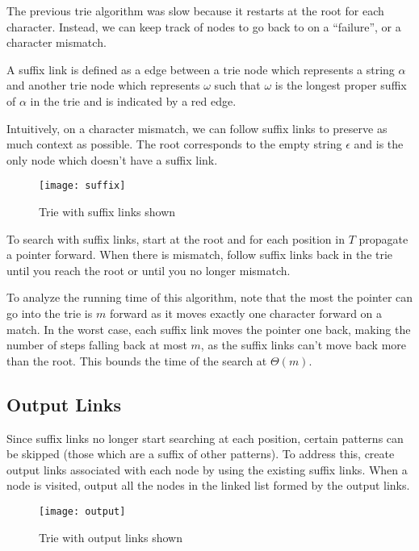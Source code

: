 \documentclass[11pt, oneside]{article}
\begin{document}
The previous trie algorithm was slow because it restarts at the root for each character.
Instead, we can keep track of nodes to go back to on a ``failure'', or a character mismatch.

A suffix link is defined as a edge between a trie node which represents a string \( \alpha \)
and another trie node which represents \( \omega \) such that \( \omega \)
is the longest proper suffix of \( \alpha \) in the trie and is indicated by a red edge.

Intuitively, on a character mismatch, we can follow suffix links to preserve as much context as possible.
The root corresponds to the empty string \( \epsilon \) and is the only node which doesn't have a suffix link.

\begin{figure}[h!]
\centering
\texttt{[image: suffix]}
\caption{Trie with suffix links shown}
\end{figure}

To search with suffix links, start at the root and for each position in \( T \) propagate a pointer
forward. When there is mismatch, follow suffix links back in the trie until you reach the root
or until you no longer mismatch.

To analyze the running time of this algorithm, note that the most the pointer can go
into the trie is \( m \) forward as it moves exactly one character forward on a match.
In the worst case, each suffix link moves the pointer one back, making the
number of steps falling back at most \( m \), as the suffix links can't move back more than the root.
This bounds the time of the search at \( \Theta(m) \).

\newpage

\subsection{Output Links}

Since suffix links no longer start searching at each position,
certain patterns can be skipped (those which are a suffix of other patterns).
To address this, create output links associated with each node by using
the existing suffix links.
When a node is visited, output all the nodes in the linked list formed by
the output links.

\begin{figure}[h!]
\centering
\texttt{[image: output]}
\caption{Trie with output links shown}
\end{figure}
\end{document}
